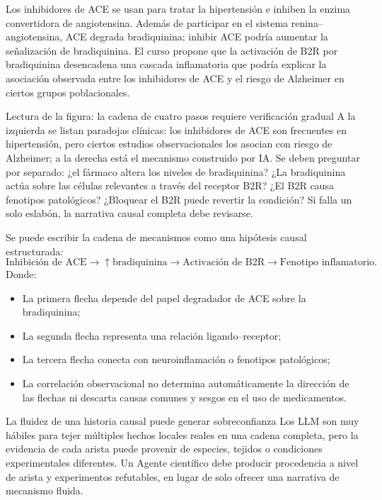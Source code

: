 Los inhibidores de ACE se usan para tratar la hipertensión e inhiben la enzima convertidora de angiotensina. Además de participar en el sistema renina--angiotensina, ACE degrada bradiquinina; inhibir ACE podría aumentar la señalización de bradiquinina. El curso propone que la activación de B2R por bradiquinina desencadena una cascada inflamatoria que podría explicar la asociación observada entre los inhibidores de ACE y el riesgo de Alzheimer en ciertos grupos poblacionales.


\begin{knowledgebox}{Lectura de la figura: la cadena de cuatro pasos requiere verificación gradual}
A la izquierda se listan paradojas clínicas: los inhibidores de ACE son frecuentes en hipertensión, pero ciertos estudios observacionales los asocian con riesgo de Alzheimer; a la derecha está el mecanismo construido por IA. Se deben preguntar por separado: ¿el fármaco altera los niveles de bradiquinina? ¿La bradiquinina actúa sobre las células relevantes a través del receptor B2R? ¿El B2R causa fenotipos patológicos? ¿Bloquear el B2R puede revertir la condición? Si falla un solo eslabón, la narrativa causal completa debe revisarse.
\end{knowledgebox}

Se puede escribir la cadena de mecanismos como una hipótesis causal estructurada:
$$
\text{Inhibición de ACE}
\rightarrow \uparrow\text{bradiquinina}
\rightarrow \text{Activación de B2R}
\rightarrow \text{Fenotipo inflamatorio}.
$$
Donde:
\begin{itemize}
  \item La primera flecha depende del papel degradador de ACE sobre la bradiquinina;
  \item La segunda flecha representa una relación ligando--receptor;
  \item La tercera flecha conecta con neuroinflamación o fenotipos patológicos;
  \item La correlación observacional no determina automáticamente la dirección de las flechas ni descarta causas comunes y sesgos en el uso de medicamentos.
\end{itemize}

\begin{warningbox}{La fluidez de una historia causal puede generar sobreconfianza}
Los LLM son muy hábiles para tejer múltiples hechos locales reales en una cadena completa, pero la evidencia de cada arista puede provenir de especies, tejidos o condiciones experimentales diferentes. Un Agente científico debe producir procedencia a nivel de arista y experimentos refutables, en lugar de solo ofrecer una narrativa de mecanismo fluida.
\end{warningbox}

